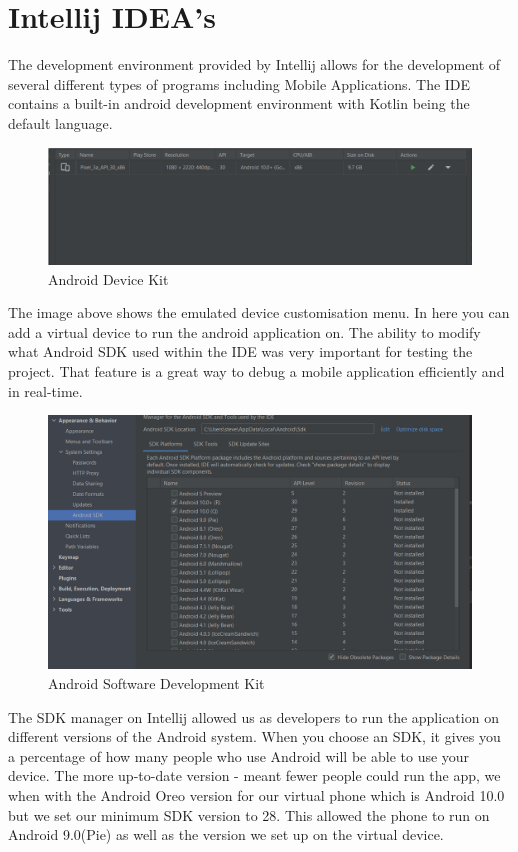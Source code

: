 \section{Intellij IDEA's}
The development environment provided by Intellij allows for the development of several different types of programs including Mobile Applications. The IDE contains a built-in android development environment with Kotlin being the default language.
\newline
\begin{figure}[H]
    \centering
    \includegraphics[width=15cm]{img/androidADK.PNG}
    \caption{Android Device Kit}
    \label{fig:adk menu}
\end{figure}
The image above shows the emulated device customisation menu. In here you can add a virtual device to run the android application on. The ability to modify what Android SDK used within the IDE was very important for testing the project. That feature is a great way to debug a mobile application efficiently and in real-time.
\begin{figure}[H]
    \centering
    \includegraphics[width=12cm]{img/androidSDK.PNG}
    \caption{Android Software Development Kit}
    \label{fig:sdk menu}
\end{figure}
The SDK manager on Intellij allowed us as developers to run the application on different versions of the Android system. When you choose an SDK, it gives you a percentage of how many people who use Android will be able to use your device. The more up-to-date version - meant fewer people could run the app, we when with the Android Oreo version for our virtual phone which is Android 10.0 but we set our minimum SDK version to 28. This allowed the phone to run on Android 9.0(Pie) as well as the version we set up on the virtual device.
